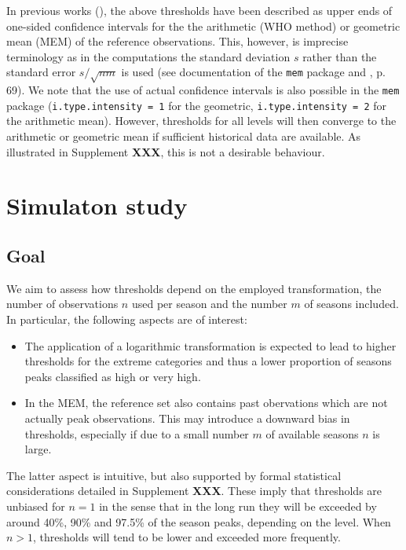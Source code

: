 \documentclass{article}
\newcommand{\sd}{s}
\begin{document}
In previous works (\citealt{WHO2014, Vega2015}), the above thresholds have been described as upper ends of one-sided confidence intervals for the the arithmetic (WHO method) or geometric mean (MEM) of the reference observations. This, however, is imprecise terminology as in the computations the standard deviation $\sd$ rather than the standard error $\sd/\sqrt{nm}$ is used (see documentation of the \texttt{mem} package and \citealt{WHO2014}, p. 69). We note that the use of actual confidence intervals is also possible in the \texttt{mem} package (\texttt{i.type.intensity = 1} for the geometric, \texttt{i.type.intensity = 2} for the arithmetic mean). However, thresholds for all levels will then converge to the arithmetic or geometric mean if sufficient historical data are available. As illustrated in Supplement \textbf{XXX}, this is not a desirable behaviour.
 

\section{Simulaton study}
\label{sec:simulation}

\subsection{Goal}

We aim to assess how thresholds depend on the employed transformation, the number of observations $n$ used per season and the number $m$ of seasons included. In particular, the following aspects are of interest:

\begin{itemize}
\item The application of a logarithmic transformation is expected to lead to higher thresholds for the extreme categories and thus a lower proportion of seasons peaks classified as high or very high.
\item In the MEM, the reference set also contains past obervations which are not actually peak observations. This may introduce a downward bias in thresholds, especially if due to a small number $m$ of available seasons $n$ is large.
\end{itemize}
The latter aspect is intuitive, but also supported by formal statistical considerations detailed in Supplement \textbf{XXX}. These imply that thresholds are unbiased for $n = 1$ in the sense that in the long run they will be exceeded by around 40\%, 90\% and 97.5\% of the season peaks, depending on the level. When $n > 1$, thresholds will tend to be lower and exceeded more frequently.
\end{document}
